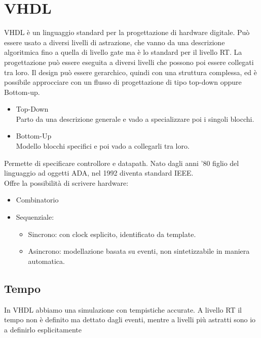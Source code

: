 \documentclass[10pt,a4paper,oneside]{scrbook}
\begin{document}
\chapter{VHDL}
VHDL è un linguaggio standard per la progettazione di hardware digitale. Può essere usato a diversi livelli di astrazione, che vanno da una descrizione algoritmica fino a quella di livello gate ma è lo standard per il livello RT. La progettazione può essere eseguita a diversi livelli che possono poi essere collegati tra loro. Il design può essere gerarchico, quindi con una struttura complessa, ed è possibile approcciare con un flusso di progettazione di tipo top-down oppure Bottom-up.
\begin{itemize}
    \item Top-Down \\
    Parto da una descrizione generale e vado a specializzare poi i singoli blocchi.
    \item Bottom-Up\\
    Modello blocchi specifici e poi vado a collegarli tra loro.
\end{itemize}
Permette di specificare controllore e datapath. Nato dagli anni '80 figlio del linguaggio ad oggetti ADA, nel 1992 diventa standard IEEE.\\
Offre la possibilità di scrivere hardware:
\begin{itemize}
    \item Combinatorio
    \item Sequenziale:
    \begin{itemize}
        \item Sincrono: con clock esplicito, identificato da template.
        \item Asincrono: modellazione basata su eventi, non sintetizzabile in maniera automatica.
    \end{itemize}
\end{itemize}

\section{Tempo}
In VHDL abbiamo una simulazione con tempistiche accurate. A livello RT il tempo non è definito ma dettato dagli eventi, mentre a livelli più astratti sono io a definirlo esplicitamente
\end{document}
